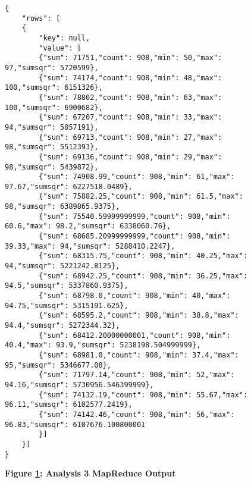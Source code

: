 \begin{figure}[H]
    \centering
    \begin{mdframed}
        \centering
        \begin{verbatim}
{
    "rows": [
    {
        "key": null,
        "value": [
        {"sum": 71751,"count": 908,"min": 50,"max": 97,"sumsqr": 5720599},
        {"sum": 74174,"count": 908,"min": 48,"max": 100,"sumsqr": 6151326},
        {"sum": 78802,"count": 908,"min": 63,"max": 100,"sumsqr": 6900682},
        {"sum": 67207,"count": 908,"min": 33,"max": 94,"sumsqr": 5057191},
        {"sum": 69713,"count": 908,"min": 27,"max": 98,"sumsqr": 5512393},
        {"sum": 69136,"count": 908,"min": 29,"max": 98,"sumsqr": 5439872},
        {"sum": 74908.99,"count": 908,"min": 61,"max": 97.67,"sumsqr": 6227518.0489},
        {"sum": 75882.25,"count": 908,"min": 61.5,"max": 98,"sumsqr": 6389865.9375},
        {"sum": 75540.59999999999,"count": 908,"min": 60.6,"max": 98.2,"sumsqr": 6338060.76},
        {"sum": 68685.20999999999,"count": 908,"min": 39.33,"max": 94,"sumsqr": 5288410.2247},
        {"sum": 68315.75,"count": 908,"min": 40.25,"max": 94,"sumsqr": 5221242.8125},
        {"sum": 68942.25,"count": 908,"min": 36.25,"max": 94.5,"sumsqr": 5337860.9375},
        {"sum": 68798.0,"count": 908,"min": 40,"max": 94.75,"sumsqr": 5315191.625},
        {"sum": 68595.2,"count": 908,"min": 38.8,"max": 94.4,"sumsqr": 5272344.32},
        {"sum": 68412.20000000001,"count": 908,"min": 40.4,"max": 93.9,"sumsqr": 5238198.504999999},
        {"sum": 68981.0,"count": 908,"min": 37.4,"max": 95,"sumsqr": 5346677.08},
        {"sum": 71797.14,"count": 908,"min": 52,"max": 94.16,"sumsqr": 5730956.546399999},
        {"sum": 74132.19,"count": 908,"min": 55.67,"max": 96.11,"sumsqr": 6102577.2419},
        {"sum": 74142.46,"count": 908,"min": 56,"max": 96.83,"sumsqr": 6107676.100800001
        }]
    }]
}      
        \end{verbatim}
    \end{mdframed}
    \caption[Analysis 3 MapReduce Output]{\textbf{Figure \ref{fig-variance-reduce-output}: Analysis 3 MapReduce Output}}
    \label{fig-variance-reduce-output}
\end{figure}
